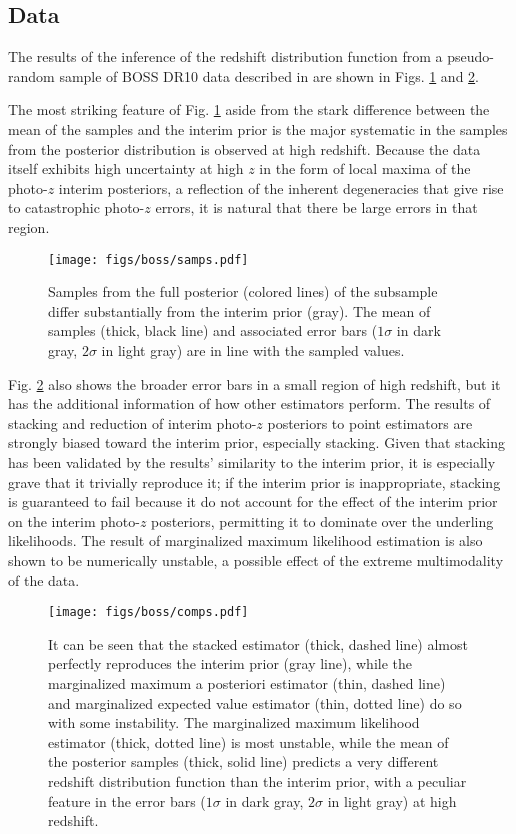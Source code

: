 \subsection{Data}

The results of the inference of the redshift distribution function from a 
pseudo-random sample of BOSS DR10 data described in  are 
shown in Figs. \ref{fig:dataparam} and \ref{fig:datacomp}.  

The most striking feature of Fig. \ref{fig:dataparam} aside from the stark 
difference between the mean of the samples and the interim prior is the major 
systematic in the samples from the posterior distribution is observed at high 
redshift.  Because the data itself exhibits high uncertainty at high $z$ in the 
form of local maxima of the photo-$z$ interim posteriors, a reflection of the 
inherent degeneracies that give rise to catastrophic photo-$z$ errors, it is 
natural that there be large errors in that region.  

\begin{figure}
	\texttt{[image: figs/boss/samps.pdf]}
	\caption{Samples from the full posterior (colored lines) of the subsample 
		differ substantially from the interim prior (gray).  The mean of samples 
		(thick, black line) and associated error bars ($1\sigma$ in dark gray, 
		$2\sigma$ in light gray) are in line with the sampled values.}
	\label{fig:dataparam}
\end{figure}

Fig. \ref{fig:datacomp} also shows the broader error bars in a small region of 
high redshift, but it has the additional information of how other estimators 
perform.  The results of stacking and reduction of interim photo-$z$ posteriors 
to point estimators are strongly biased toward the interim prior, especially 
stacking.  Given that stacking has been validated by the results' similarity to 
the interim prior, it is especially grave that it trivially reproduce it; if 
the interim prior is inappropriate, stacking is guaranteed to fail because it 
do not account for the effect of the interim prior on the interim photo-$z$ 
posteriors, permitting it to dominate over the underling likelihoods.  The 
result of marginalized maximum likelihood estimation is also shown to be 
numerically unstable, a possible effect of the extreme multimodality of the 
data.  

\begin{figure}
	\texttt{[image: figs/boss/comps.pdf]}
	\caption{It can be seen that the stacked estimator (thick, dashed line) almost 
		perfectly reproduces the interim prior (gray line), while the marginalized 
		maximum a posteriori estimator (thin, dashed line) and marginalized expected 
		value estimator (thin, dotted line) do so with some instability.  The 
		marginalized maximum likelihood estimator (thick, dotted line) is most 
		unstable, while the mean of the posterior samples (thick, solid line) predicts 
		a very different redshift distribution function than the interim prior, with a 
		peculiar feature in the error bars ($1\sigma$ in dark gray, $2\sigma$ in light 
		gray) at high redshift.}
	\label{fig:datacomp}
\end{figure}

